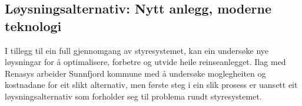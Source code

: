 \subsection{Løysningsalternativ: Nytt anlegg, moderne teknologi}
I tillegg til ein full gjennomgang av styresystemet, 
kan ein undersøke nye løysningar for å optimalisere, forbetre og utvide heile reinseanlegget.
Ilag med Renasys arbeider Sunnfjord kommune med å undersøke moglegheiten og kostnadane for eit slikt alternativ,
men første steg i ein slik prosess er uansett eit løysningsalternativ som forholder seg til problema rundt styresystemet.
